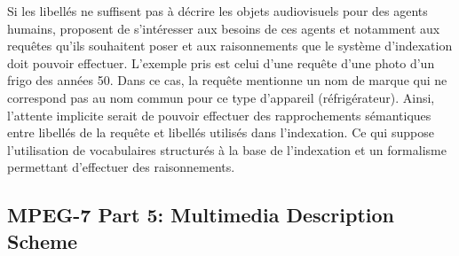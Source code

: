 Si les libellés ne suffisent pas à décrire les objets audiovisuels pour des agents humains, \citeauthor{hare:semantic-gap} proposent de s'intéresser aux besoins de ces agents et notamment aux requêtes qu'ils souhaitent poser et aux raisonnements que le système d'indexation doit pouvoir effectuer. 
L'exemple pris est celui d'une requête d'une photo d'un frigo des années 50. 
Dans ce cas, la requête mentionne un nom de marque qui ne correspond pas au nom commun pour ce type d'appareil (réfrigérateur). 
Ainsi, l'attente implicite serait de pouvoir effectuer des rapprochements sémantiques entre libellés de la requête et libellés utilisés dans l'indexation. 
Ce qui suppose l'utilisation de vocabulaires structurés à la base de l'indexation et un formalisme permettant d'effectuer des raisonnements. 










\subsection{MPEG-7 Part 5: Multimedia Description Scheme}

